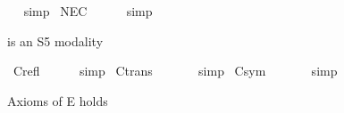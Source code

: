 \begin{isabellebody}
\isadelimproof
\ %
\endisadelimproof
%
\isatagproof
{}\isamarkupfalse%
\ simp%
\endisatagproof
{\isafoldproof}%
%
\isadelimproof
%
\endisadelimproof
\isanewline
{}\isamarkupfalse%
\ NEC{\isacharcolon}{\kern0pt}\ {\isachardoublequoteopen}{\isasymlfloor}{\isasymphi}{\isasymrfloor}\ {\isasymLongrightarrow}\ {\isasymlfloor}{\isasymbox}{\isasymphi}{\isasymrfloor}{\isachardoublequoteclose}%
\isadelimproof
\ %
\endisadelimproof
%
\isatagproof
{}\isamarkupfalse%
\ simp%
\endisatagproof
{\isafoldproof}%
%
\isadelimproof
%
\endisadelimproof
%
\begin{isamarkuptext}%
\isa{{\isasymbox}} is an S5 modality%
\end{isamarkuptext}\isamarkuptrue%
\isamarkupfalse%
\ C{\isacharunderscore}{\kern0pt}{}{\isacharunderscore}{\kern0pt}refl{\isacharcolon}{\kern0pt}\ {\isachardoublequoteopen}{\isasymlfloor}{\isasymbox}{\isasymphi}\ \isactrlbold {\isasymrightarrow}\ {\isasymphi}{\isasymrfloor}{\isachardoublequoteclose}%
\isadelimproof
\ %
\endisadelimproof
%
\isatagproof
{}\isamarkupfalse%
\ simp%
\endisatagproof
{\isafoldproof}%
%
\isadelimproof
%
\endisadelimproof
\isanewline
{}\isamarkupfalse%
\ C{\isacharunderscore}{\kern0pt}{}{\isacharunderscore}{\kern0pt}trans{\isacharcolon}{\kern0pt}\ {\isachardoublequoteopen}{\isasymlfloor}{\isasymbox}{\isasymphi}\ \isactrlbold {\isasymrightarrow}\ {\isacharparenleft}{\kern0pt}{\isasymbox}{\isacharparenleft}{\kern0pt}{\isasymbox}{\isasymphi}{\isacharparenright}{\kern0pt}{\isacharparenright}{\kern0pt}{\isasymrfloor}{\isachardoublequoteclose}%
\isadelimproof
\ \ %
\endisadelimproof
%
\isatagproof
{}\isamarkupfalse%
\ simp%
\endisatagproof
{\isafoldproof}%
%
\isadelimproof
%
\endisadelimproof
\isanewline
{}\isamarkupfalse%
\ C{\isacharunderscore}{\kern0pt}{}{\isacharunderscore}{\kern0pt}sym{\isacharcolon}{\kern0pt}\ {\isachardoublequoteopen}{\isasymlfloor}{\isasymphi}\ \isactrlbold {\isasymrightarrow}\ {\isacharparenleft}{\kern0pt}{\isasymbox}{\isacharparenleft}{\kern0pt}{\isasymdiamond}{\isasymphi}{\isacharparenright}{\kern0pt}{\isacharparenright}{\kern0pt}{\isasymrfloor}{\isachardoublequoteclose}%
\isadelimproof
\ \ %
\endisadelimproof
%
\isatagproof
{}\isamarkupfalse%
\ simp%
\endisatagproof
{\isafoldproof}%
%
\isadelimproof
%
\endisadelimproof
%
\begin{isamarkuptext}%
Axioms of E holds%
\end{isamarkuptext}\isamarkuptrue%

\end{isabellebody}
